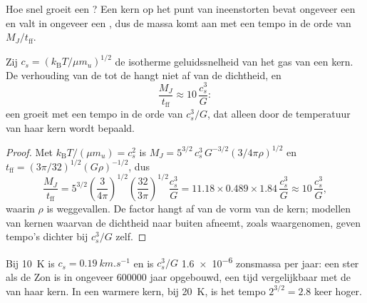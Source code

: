 Hoe snel groeit een ? Een kern op het punt van ineenstorten bevat ongeveer een 
en valt in ongeveer een , dus de massa komt aan met een tempo in de orde van
$M_J/t_{\mathrm{ff}}$.

\begin{proposition}
\label{prop:b2:ism-star-formation:accretion}
Zij $c_s = (k_{\mathrm B}T/\mu m_u)^{1/2}$ de isotherme geluidssnelheid
van het gas van een kern. De verhouding van de  tot de  hangt
niet af van de dichtheid, en
\[
  \frac{M_J}{t_{\mathrm{ff}}} \approx 10\,\frac{c_s^3}{G}:
\]
een  groeit met een tempo in de orde van $c_s^3/G$, dat alleen door de temperatuur van haar
kern wordt bepaald.
\end{proposition}

\begin{proof}
Met $k_{\mathrm B}T/(\mu m_u) = c_s^2$ is $M_J = 5^{3/2}\,c_s^3\,G^{-3/2}
(3/4\pi\rho)^{1/2}$ en $t_{\mathrm{ff}} = (3\pi/32)^{1/2}(G\rho)^{-1/2}$, dus
\[
  \frac{M_J}{t_{\mathrm{ff}}} = 5^{3/2}\left(\frac{3}{4\pi}\right)^{1/2}
  \left(\frac{32}{3\pi}\right)^{1/2}\frac{c_s^3}{G}
  = 11.18\times0.489\times1.84\,\frac{c_s^3}{G} \approx 10\,\frac{c_s^3}{G},
\]
waarin $\rho$ is weggevallen. De factor hangt af van de vorm van de kern;
modellen van kernen waarvan de dichtheid naar buiten afneemt, zoals waargenomen, geven tempo's
dichter bij $c_s^3/G$ zelf.
\end{proof}

Bij \qty{10}{K} is $c_s = \qty{0.19}{km.s^{-1}}$ en is $c_s^3/G$
\num{1.6e-6} zonsmassa per jaar: een ster als de Zon is in ongeveer
\num{600000} jaar opgebouwd, een tijd vergelijkbaar met de  van haar kern.
In een warmere kern, bij \qty{20}{K}, is het tempo $2^{3/2} = 2.8$ keer hoger.

